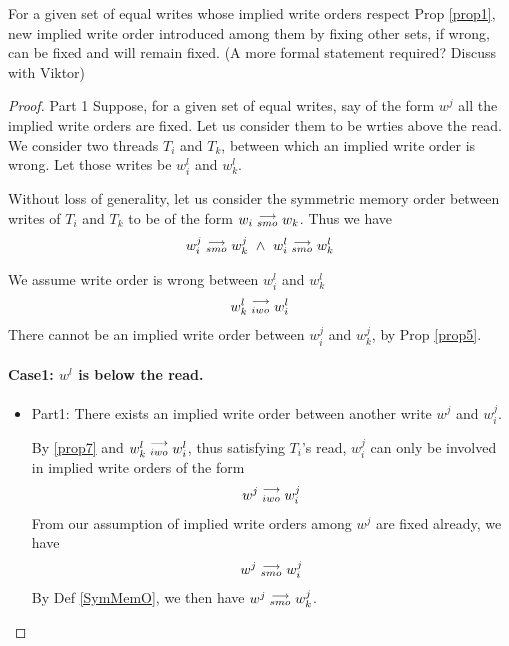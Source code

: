        \begin{lemma}
            For a given set of equal writes whose implied write orders respect Prop \ref{prop1},  new implied write order introduced among them by fixing other sets, if wrong, can be fixed and will remain fixed. 
            (A more formal statement required? Discuss with Viktor)        
        \end{lemma}

        \begin{proof}{Part 1}
            Suppose, for a given set of equal writes, say of the form $w^j$ all the implied write orders are fixed. Let us consider them to be wrties above the read. We consider two threads $T_i$ and $T_k$, between which an implied write order is wrong. Let those writes be $w_i^l$ and $w_k^l$. 

            Without loss of generality, let us consider the symmetric memory order between writes of $T_i$ and $T_k$ to be of the form $w_i\stackrel{\longrightarrow}{_{smo}}w_k$. Thus we have 
            \begin{align*}
                \reln{w_i^j}{smo}{w_k^j} \ \wedge \ \reln{w_i^l}{smo}{w_k^l}
            \end{align*}

            We assume write order is wrong between $w_i^l$ and $w_k^l$
            \begin{align*}
                w_k^l\stackrel{\longrightarrow}{_{iwo}}w_i^l
            \end{align*} 
            There cannot be an implied write order between $w_i^j$ and $w_k^j$, by Prop \ref{prop5}. 

            \paragraph{Case1: $w^l$ is below the read.}
                
                \begin{itemize}
                    \item Part1: There exists an implied write order between another write $w^j$ and $w_i^j$. 

                        By \ref{prop7} and $w_k^l\stackrel{\longrightarrow}{_{iwo}}w_i^l$, thus satisfying $T_i$'s read, $w_i^j$ can only be involved in implied    write orders of the form 
                        \begin{align*}
                            w^j\stackrel{\longrightarrow}{_{iwo}}w_i^j
                        \end{align*}
                        From our assumption of implied write orders among $w^j$ are fixed already, we have
                        \begin{align*}
                            w^j\stackrel{\longrightarrow}{_{smo}}w_i^j 
                        \end{align*} 
                        By Def \ref{SymMemO}, we then have $w^j\stackrel{\longrightarrow}{_{smo}}w_k^j$.


\end{itemize}
\end{proof}
